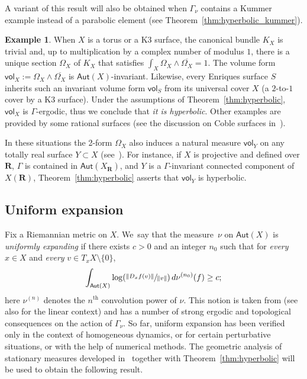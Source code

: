 \documentclass[JEP,XML,SOM,Unicode,published]{cedram}
\newcommand{\Psfrac}[2]{(\sfrac{#1}{#2})}
\newcommand{\norm}[1]{{\left\Vert#1\right\Vert}}
\def\R{\mathbf{R}}
\newcommand\Aut{\mathsf{Aut}}
\newcommand{\vol}{{\mathsf{vol}}}
\theoremstyle{plain}
\theoremstyle{definition}
\newtheorem{example}[thm]{Example}
\begin{document}
A variant of this result will also be obtained when $\Gamma_\nu$ contains a Kummer example
instead of a parabolic element (see Theorem~\ref{thm:hyperbolic_kummer}).

\begin{example}\label{eg:K3_intro} When $X$ is a torus or a K3 surface, the canonical bundle $K_X$ is trivial and, up to multiplication by a complex number of modulus $1$, there is
a unique section $\Omega_X$ of $K_X$ that satisfies $\int_X\Omega_X\wedge \overline{\Omega_X}=1$. The volume form $\vol_X:=\Omega_X\wedge \overline{\Omega_X}$
is $\Aut(X)$-invariant. Likewise, every Enriques surface $S$ inherits such an invariant volume form $\vol_S$ from its universal cover $X$ (a $2$-to-$1$ cover by a K3 surface).
Under the assumptions of Theorem~\ref{thm:hyperbolic}, $\vol_X$ is $\Gamma$-ergodic,
thus we conclude that {\textit{it is hyperbolic}}. Other examples are provided by some rational surfaces (see the discussion on Coble surfaces in~\cite{Simons}).

In these situations the 2-form $\Omega_X$ also induces a natural measure $\vol_Y$ on any totally real surface $Y\subset X$ (see~\cite[Rem.\,2.3]{invariant}). For instance, if $X$ is projective and defined over $\R$, $\Gamma$ is contained in $\Aut(X_\R)$, and $Y$ is a $\Gamma$-invariant connected component of $X(\R)$, Theorem~\ref{thm:hyperbolic} asserts that $\vol_Y$ is hyperbolic.
\end{example}

\subsection{Uniform expansion}\label{subs:UE_intro}

Fix a Riemannian
metric on $X$. We~say that the measure~$\nu$ on $\Aut(X)$
is \emph{uniformly expanding} if there exists $c>0$ and an integer $n_0$ such that for \emph{every} $x\in X$ and \emph{every} $v\in T_xX\setminus\{ 0\}$,\vspace*{-3pt}\enlargethispage{.5\baselineskip}
\begin{equation}\label{eq:UE}
\int_{\Aut(X)} \log\Psfrac{\norm{D_xf (v)}}{\norm{v}} \,d\nu^{(n_0)}(f) \geq c;
\end{equation}
here $\nu^{(n)}$ denotes the $n^\mathrm{th}$ convolution power of $\nu$.
This notion is taken from
\cite{chung, dolgopyat-krikorian, liu_thesis, zzhang} (see also \cite{Eskin-Lindenstrauss:RandomWalk, Prohaska-Sert:TAMS} for the linear context) and has a number
of strong ergodic and topological consequences on the action of $\Gamma_\nu$.
So far, uniform expansion has been verified only in the context of homogeneous dynamics, or for certain perturbative situations, or with the help of numerical methods.
The geometric analysis of stationary measures developed in~\cite{stiffness} together with Theorem~\ref{thm:hyperbolic}
will be used to obtain the following result.
\end{document}
